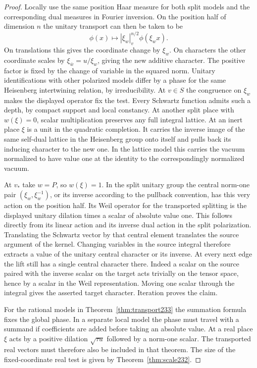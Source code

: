 \documentclass[a4paper,11pt]{article}
\theoremstyle{definition}
\theoremstyle{remark}
\numberwithin{equation}{section}
\begin{document}
\begin{proof}
Locally use the same position Haar measure for both split models
and the corresponding dual measures in Fourier inversion. On the
position half of dimension \(n\) the unitary transport can then
be taken to be
\[
       \phi(x)\longmapsto |\xi_w|_v^{n/2}\phi(\xi_w x).
\]
On translations this gives the coordinate change by \(\xi_w\).
On characters the other coordinate scales by
\(\xi_{\bar w}=u/\xi_w\), giving the new additive character. The
positive factor is fixed by the change of variable in the squared
norm. Unitary identifications with other polarized models differ
by a phase for the same Heisenberg intertwining relation, by
irreducibility. At \(v\in S\) the congruence on \(\xi_w\) makes
the displayed operator fix the test. Every Schwartz function admits
such a depth, by compact support and local constancy. At another
split place with \(w(\xi)=0\), scalar multiplication preserves any
full integral lattice. At an inert place \(\xi\) is a unit in the
quadratic completion. It carries the inverse image of the same
self-dual lattice in the Heisenberg group onto itself and pulls
back its inducing character to the new one. In the lattice model
this carries the vacuum normalized to have value one at the
identity to the correspondingly normalized vacuum.

At \(v_*\) take \(w=P\), so \(w(\xi)=1\). In the split unitary
group the central norm-one pair \((\xi_w,\xi_w^{-1})\), or its
inverse according to the pullback convention, has this very action
on the position half. Its Weil operator for the transported splitting
is the displayed unitary dilation times a scalar of absolute value
one. This follows directly from its linear action and its inverse
dual action in the split polarization. Translating the Schwartz
vector by that central element translates the source argument of
the kernel. Changing variables in the source integral therefore
extracts a value of the unitary central character or its inverse.
At every next edge the lift still has a single central character
there. Indeed a scalar on the source paired with the inverse scalar
on the target acts trivially on the tensor space, hence by a scalar
in the Weil representation. Moving one scalar through the integral
gives the asserted target character. Iteration proves the claim.

For the rational models in Theorem~\ref{thm:transport233} the
summation formula fixes the global phase. In a separate local model
the phase must travel with a summand if coefficients are added
before taking an absolute value. At a real place \(\xi\) acts by a
positive dilation \(\sqrt{\tau u}\) followed by a norm-one scalar.
The transported real vectors must therefore also be included in
that theorem. The size of the fixed-coordinate real test is given
by Theorem~\ref{thm:scale232}.
\end{proof}
\end{document}
